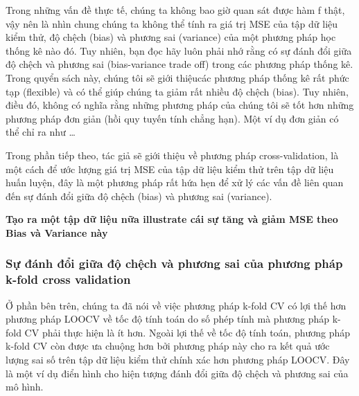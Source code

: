 \documentclass[
]{article}
\begin{document}
Trong những vấn đề thực tế, chúng ta không bao giờ quan sát được hàm f thật, vậy nên là nhìn chung chúng ta không thể tính ra giá trị MSE của tập dữ liệu kiểm thử, độ chệch (bias) và phương sai (variance) của một phương pháp học thống kê nào đó. Tuy nhiên, bạn đọc hãy luôn phải nhớ rằng có sự đánh đổi giữa độ chệch và phương sai (bias-variance trade off) trong các phương pháp thống kê. Trong quyển sách này, chúng tôi sẽ giới thiệucác phương pháp thống kê rất phức tạp (flexible) và có thể giúp chúng ta giảm rất nhiều độ chệch (bias). Tuy nhiên, điều đó, không có nghĩa rằng những phương pháp của chúng tôi sẽ tốt hơn những phương pháp đơn giản (hồi quy tuyến tính chẳng hạn). Một ví dụ đơn giản có thể chỉ ra như \ldots{}

Trong phần tiếp theo, tác giả sẽ giới thiệu về phương pháp cross-validation, là một cách để ước lượng giá trị MSE của tập dữ liệu kiểm thử trên tập dữ liệu huấn luyện, đây là một phương pháp rất hứa hẹn để xử lý các vấn đề liên quan đến sự đánh đổi giữa độ chệch (bias) và phương sai (variance).

\textbf{Tạo ra một tập dữ liệu nữa illustrate cái sự tăng và giảm MSE theo Bias và Variance này}

\hypertarget{sux1ef1-ux111uxe1nh-ux111ux1ed5i-giux1eefa-ux111ux1ed9-chux1ec7ch-vuxe0-phux1b0ux1a1ng-sai-cux1ee7a-phux1b0ux1a1ng-phuxe1p-k-fold-cross-validation}{%
\subsubsection{Sự đánh đổi giữa độ chệch và phương sai của phương pháp k-fold cross validation}\label{sux1ef1-ux111uxe1nh-ux111ux1ed5i-giux1eefa-ux111ux1ed9-chux1ec7ch-vuxe0-phux1b0ux1a1ng-sai-cux1ee7a-phux1b0ux1a1ng-phuxe1p-k-fold-cross-validation}}

Ở phần bên trên, chúng ta đã nói về việc phương pháp k-fold CV có lợi thế hơn phương pháp LOOCV về tốc độ tính toán do số phép tính mà phương pháp k-fold CV phải thực hiện là ít hơn. Ngoài lợi thế về tốc độ tính toán, phương pháp k-fold CV còn được ưa chuộng hơn bởi phương pháp này cho ra kết quả ước lượng sai số trên tập dữ liệu kiểm thử chính xác hơn phương pháp LOOCV. Đây là một ví dụ điển hình cho hiện tượng đánh đổi giữa độ chệch và phương sai của mô hình.
\end{document}

